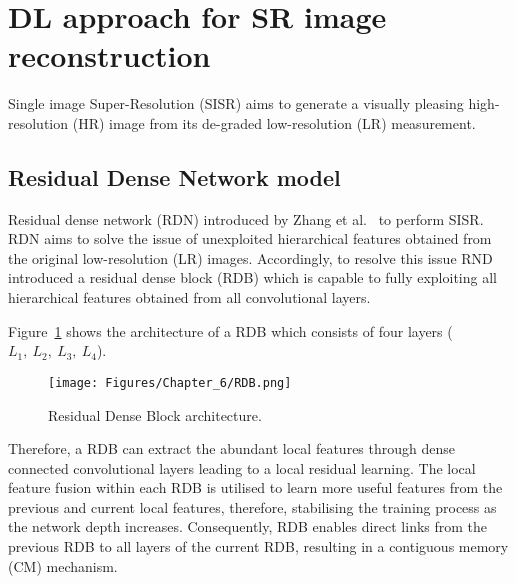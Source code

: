 \section{DL approach for SR image reconstruction}
\label{sec63}
Single image Super-Resolution (SISR) aims to generate a visually pleasing high-resolution (HR) image from its de-graded low-resolution (LR) measurement.

\subsection{Residual Dense Network model}
Residual dense network (RDN) introduced by Zhang et al.~\cite{Zhang2018} to perform SISR.
RDN aims to solve the issue of unexploited hierarchical features obtained from the original low-resolution (LR) images.
Accordingly, to resolve this issue RND introduced a residual dense block (RDB) which is capable to fully exploiting all hierarchical features obtained from all convolutional layers.

Figure~\ref{fig:RDB} shows the architecture of a RDB which consists of four  layers (\(L_1,\ L_2,\ L_3,\ L_4\)).
\begin{figure} [h!]
	\begin{center}
		\texttt{[image: Figures/Chapter\_6/RDB.png]}
	\end{center}
	\caption{Residual Dense Block architecture.} 
	\label{fig:RDB}
\end{figure}
Therefore, a RDB can extract the abundant local features through dense connected convolutional layers leading to a local residual learning.
The local feature fusion within each RDB is utilised to learn more useful features from the previous and current local features, therefore, stabilising the training process as the network depth increases.
Consequently, RDB enables direct links from the previous RDB to all layers of the current RDB, resulting in a contiguous memory (CM) mechanism.

